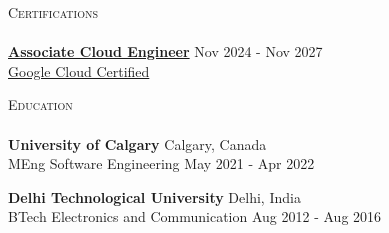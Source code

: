 \documentclass[a4paper]{article}
\newcommand{\lineunder} {
    \vspace*{-8pt} \\
    \hspace*{-18pt} \hrulefill \\
}
\newcommand{\header} [1] {
    \vspace*{5pt}
    {\hspace*{-18pt}\vspace*{6pt} \large\textsc{#1}}
    \vspace*{-6pt} \lineunder
}
\newcommand{\resumeHeadingEducation}[4]{
    \textbf{#1} \hfill {#2}\\
    {#3} \hfill {#4}\\
    \vspace{2mm}
}
\begin{document}
\header{Certifications}
\href{https://www.credly.com/badges/52bb681c-f535-47e7-b669-78e9b4d7c4a0}{\textbf{Associate Cloud Engineer}} \hfill Nov 2024 - Nov 2027\\
\href{https://www.credly.com/badges/52bb681c-f535-47e7-b669-78e9b4d7c4a0}{Google Cloud Certified}
\vspace{2mm}


\header{Education}

\resumeHeadingEducation {University of Calgary} {Calgary, Canada} {MEng Software Engineering} {May 2021 - Apr 2022}
\resumeHeadingEducation {Delhi Technological University} {Delhi, India} {BTech Electronics and Communication} {Aug 2012 - Aug 2016}


\
\end{document}
